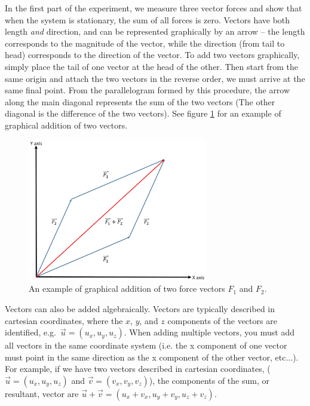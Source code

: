 In the first part of the experiment, we measure three vector forces and show that when the system is stationary, the sum of all forces is zero. Vectors have both length \emph{and} direction, and can be represented graphically by an arrow -- the length corresponds to the magnitude of the vector, while the direction (from tail to head) corresponds to the direction of the vector. To add two vectors graphically, simply place the tail of one vector at the head of the other. Then start from the same origin and attach the two vectors in the reverse order, we must arrive at the same final point. From the parallelogram formed by this procedure, the arrow along the main diagonal represents the sum of the two vectors (The other diagonal is the difference of the two vectors). See figure \ref{fig:graph} for an example of graphical addition of two vectors.
\begin{figure}[h]
    \begin{center}
        \includegraphics[width=0.7\textwidth]{./Exp3/pic/image11.jpg}
    \end{center}
    \caption{An example of graphical addition of two force vectors $F_1$ and $F_2$.}
    \label{fig:graph}
\end{figure}

Vectors can also be added algebraically. Vectors are typically described in cartesian coordinates, where the $x$, $y$, and $z$ components of the vectors are identified, e.g.\ $\vec u = (u_x,u_y,u_z)$. When adding multiple vectors, you must add all vectors in the same coordinate system (i.e. the x component of one vector must point in the same direction as the x component of the other vector, etc...). For example, if we have two vectors described in cartesian coordinates, ($\vec u = (u_x,u_y,u_z)$ and $\vec v = (v_x,v_y,v_z)$), the components of the sum, or resultant, vector are $\vec u+\vec v = (u_x + v_x, u_y + v_y, u_z + v_z)$.\myskip

